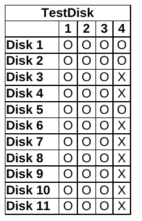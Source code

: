 \begin{paraphrase}
\begin{figure}
\begin{subfigure}{0.17\linewidth}
        \includegraphics[width=\linewidth]{fig/testdisk_results_fat.pdf}
    \end{subfigure}~~
    \begin{subfigure}{0.17\linewidth}

\end{subfigure}
\end{figure}
\end{paraphrase}
